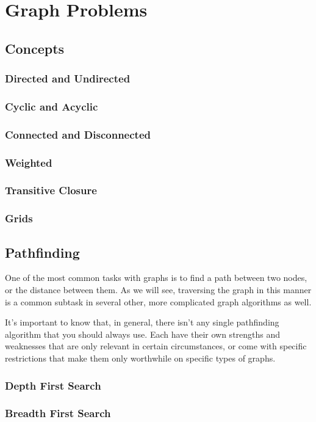 \section{Graph Problems}
\subsection{Concepts}
\subsubsection{Directed and Undirected}
\subsubsection{Cyclic and Acyclic}
\subsubsection{Connected and Disconnected}
\subsubsection{Weighted}
\subsubsection{Transitive Closure}
\subsubsection{Grids}
\subsection{Pathfinding}

One of the most common tasks with graphs is to find a path between two nodes, or the distance between them. As we will see, traversing the graph in this manner is a common subtask in several other, more complicated graph algorithms as well.

It's important to know that, in general, there isn't any single pathfinding algorithm that you should always use. Each have their own strengths and weaknesses that are only relevant in certain circumstances, or come with specific restrictions that make them only worthwhile on specific types of graphs.

\subsubsection{Depth First Search}
\subsubsection{Breadth First Search}
